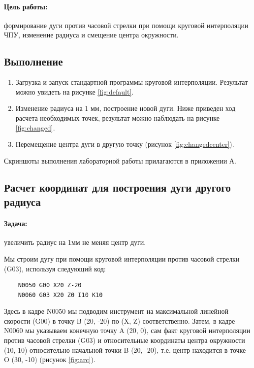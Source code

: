 \paragraph{Цель работы:} формирование дуги против часовой стрелки при помощи круговой интерполяции ЧПУ, изменение радиуса и смещение центра окружности.

\subsection*{Выполнение}

\begin{enumerate}
    \item Загрузка и запуск стандартной программы круговой интерполяции. Результат можно увидеть на рисунке \ref{fig:default}.
    \item Изменение радиуса на 1 мм, построение новой дуги. Ниже приведен ход расчета необходимых точек, результат можно наблюдать на рисунке \ref{fig:changed}.
    \item Перемещение центра дуги в другую точку (рисунок \ref{fig:changedcenter}).
\end{enumerate}

Скриншоты выполнения лабораторной работы прилагаются в приложении А.

\subsection*{Расчет координат для построения дуги другого радиуса}

\paragraph{Задача:} увеличить радиус на 1мм не меняя центр дуги.

Мы строим дугу при помощи круговой интерполяции против часовой стрелки (G03), используя следующий код:

\begin{verbatim}
	N0050 G00 X20 Z-20
	N0060 G03 X20 Z0 I10 K10
\end{verbatim}

Здесь в кадре N0050 мы подводим инструмент на максимальной линейной скорости (G00) в точку B (20, -20) по (X, Z) соответственно. Затем, в кадре N0060 мы указываем конечную точку A (20, 0), сам факт круговой интерполяции против часовой стрелки (G03) и относительные координаты центра окружности (10, 10) относительно начальной точки B (20, -20), т.е. центр находится в точке O (30, -10) (рисунок \ref{fig:arc}).


